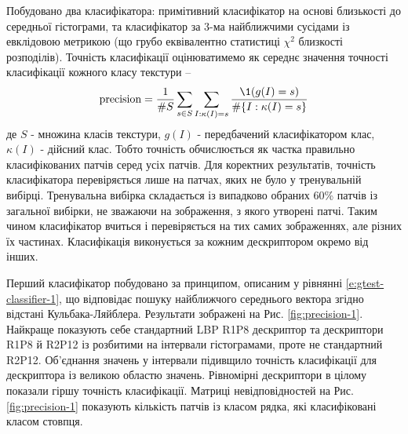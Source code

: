 Побудовано два класифікатора: примітивний класифікатор на основі близькості до середньої гістограми, 
та класифікатор за 3-ма найближчими сусідами із евклідовою метрикою (що грубо еквівалентно статистиці $\chi^2$ близкості розподілів).
Точність класифікації оцінюватимемо як середнє значення точності класифікації кожного класу текстури --
\begin{equation*}
    \text{precision} = \frac{1}{\# S} \sum_{s \in S} \sum_{I : \kappa(I) = s} \frac{\1(g(I) = s)}{\# \{I : \kappa(I) = s\}}
\end{equation*}
де $S$ - множина класів текстури, $g(I)$ - передбачений класифікатором клас, $\kappa(I)$ - дійсний клас. 
Тобто точність обчислюється як частка правильно класифікованих патчів серед усіх патчів.
Для коректних результатів, точність класифікатора перевіряється лише на патчах, яких не було у тренувальній вибірці.
Тренувальна вибірка складається із випадково обраних 60\% патчів із загальної вибірки, не зважаючи на зображення, з якого утворені патчі.
Таким чином класифікатор вчиться і перевіряється на тих самих зображеннях, але різних їх частинах.
Класифікація виконується за кожним дескриптором окремо від інших.

Перший класифікатор побудовано за принципом, описаним у рівнянні \ref{e:gtest-classifier-1}, 
що відповідає пошуку найближчого середнього вектора згідно відстані Кульбака-Ляйблера.
Результати зображені на Рис. \ref{fig:precision-1}.
Найкраще показують себе стандартний LBP R1P8 дескриптор та дескриптори R1P8 й R2P12 із розбитими на інтервали гістограмами, проте не стандартний R2P12.
Об'єднання значень у інтервали підивщило точність класифікації для дескриптора із великою областю значень.
Рівномірні дескриптори в цілому показали гіршу точність класифікації.
Матриці невідповідностей на Рис. \ref{fig:precision-1} показують кількість патчів із класом рядка, які класифіковані класом стовпця. 

